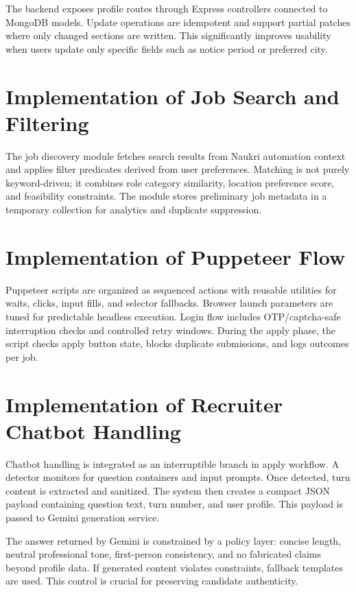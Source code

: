 \documentclass[12pt,a4paper,oneside]{report}
\begin{document}
The backend exposes profile routes through Express controllers connected to MongoDB models. Update operations are idempotent and support partial patches where only changed sections are written. This significantly improves usability when users update only specific fields such as notice period or preferred city.

\section{Implementation of Job Search and Filtering}
The job discovery module fetches search results from Naukri automation context and applies filter predicates derived from user preferences. Matching is not purely keyword-driven; it combines role category similarity, location preference score, and feasibility constraints. The module stores preliminary job metadata in a temporary collection for analytics and duplicate suppression.

\section{Implementation of Puppeteer Flow}
Puppeteer scripts are organized as sequenced actions with reusable utilities for waits, clicks, input fills, and selector fallbacks. Browser launch parameters are tuned for predictable headless execution. Login flow includes OTP/captcha-safe interruption checks and controlled retry windows. During the apply phase, the script checks apply button state, blocks duplicate submissions, and logs outcomes per job.

\section{Implementation of Recruiter Chatbot Handling}
Chatbot handling is integrated as an interruptible branch in apply workflow. A detector monitors for question containers and input prompts. Once detected, turn content is extracted and sanitized. The system then creates a compact JSON payload containing question text, turn number, and user profile. This payload is passed to Gemini generation service.

The answer returned by Gemini is constrained by a policy layer: concise length, neutral professional tone, first-person consistency, and no fabricated claims beyond profile data. If generated content violates constraints, fallback templates are used. This control is crucial for preserving candidate authenticity.
\end{document}

